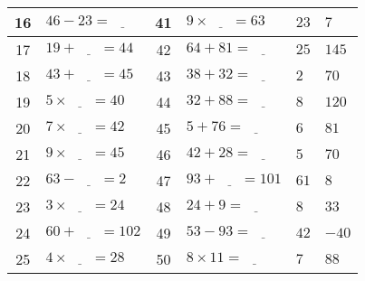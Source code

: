 \documentclass[french,a4paper,10pt]{article}
\begin{document}
\begin{tabular}{|c|p{4cm}|c|p{4cm}||p{1cm}|p{1cm}|}
\hline
16 & $46 - 23 = \underline{\phantom{999}}$ & 41 & $9 \times \underline{\phantom{999}} = 63$ & $23$ & $7$ \\
\hline
17 & $19 + \underline{\phantom{999}} = 44$ & 42 & $64 + 81 = \underline{\phantom{999}}$ & $25$ & $145$ \\
\hline
18 & $43 + \underline{\phantom{999}} = 45$ & 43 & $38 + 32 = \underline{\phantom{999}}$ & $2$ & $70$ \\
\hline
19 & $5 \times \underline{\phantom{999}} = 40$ & 44 & $32 + 88 = \underline{\phantom{999}}$ & $8$ & $120$ \\
\hline
20 & $7 \times \underline{\phantom{999}} = 42$ & 45 & $5 + 76 = \underline{\phantom{999}}$ & $6$ & $81$ \\
\hline
21 & $9 \times \underline{\phantom{999}} = 45$ & 46 & $42 + 28 = \underline{\phantom{999}}$ & $5$ & $70$ \\
\hline
22 & $63 - \underline{\phantom{999}} = 2$ & 47 & $93 + \underline{\phantom{999}} = 101$ & $61$ & $8$ \\
\hline
23 & $3 \times \underline{\phantom{999}} = 24$ & 48 & $24 + 9 = \underline{\phantom{999}}$ & $8$ & $33$ \\
\hline
24 & $60 + \underline{\phantom{999}} = 102$ & 49 & $53 - 93 = \underline{\phantom{999}}$ & $42$ & $-40$ \\
\hline
25 & $4 \times \underline{\phantom{999}} = 28$ & 50 & $8 \times 11 = \underline{\phantom{999}}$ & $7$ & $88$ \\
\hline

\end{tabular}
\end{document}
